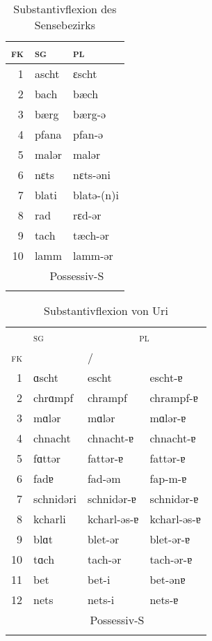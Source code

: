 
\begin{table}[H]
	\caption{Substantivflexion des Sensebezirks \citep[179-190]{Henzen1927}}\label{table7}
	\begin{tabular}{rll}
		\lsptoprule
		\textsc{fk} & \textsc{sg} & \textsc{pl}\\\midrule
		1 & ascht & ɛscht\\
		2 & bach & bæch\\
		3 & bærg & bærg-ə\\
		4 & pfana & pfan-ə\\
		5 & malər & malər\\
		6 & nɛts & nɛts-əni\\
		7 & blati & blatə{}-(n)i\\
		8 & rad & rɛd-ər\\
		9 & tach & tæch-ər\\
		10 & lamm & lamm-ər\\
		& \multicolumn{2}{c}{Possessiv-S}\\
		\lspbottomrule
	\end{tabular}
\end{table}



\begin{table}[H]
	\caption{Substantivflexion von Uri \citep[173-185]{Clauß1929}}\label{table8}
	\begin{tabular}{rlll}
		\lsptoprule
		& \textsc{sg} & \multicolumn{2}{c}{\textsc{pl}}\\\cmidrule(lr){3-4}
		\textsc{fk} &  & \NOM\slash\AKK & \DAT\\\midrule
		1 & ɑscht & escht & escht-ɐ\\
		2 & chrɑmpf & chrampf & chrampf-ɐ\\
		3 & mɑlər & mɑlər & mɑlər-ɐ\\
		4 & chnacht & chnacht-ɐ & chnacht-ɐ\\
		5 & fɑttər & fattər-ɐ & fattər-ɐ\\
		6 & fadɐ & fad-əm & fap-m-ɐ\\
		7 & schnidəri & schnidər-ɐ & schnidər-ɐ\\
		8 & kcharli & kcharl-əs-ɐ & kcharl-əs-ɐ\\
		9 & blɑt & blet-ǝr & blet-ǝr-ɐ\\
		10 & tɑch & tach-ər & tach-ər-ɐ\\
		11 & bet & bet-i & bet-ənɐ\\
		12 & nets & nets-i & nets-ɐ\\
		& \multicolumn{3}{c}{Possessiv-S}\\
		\lspbottomrule
	\end{tabular}
\end{table}

